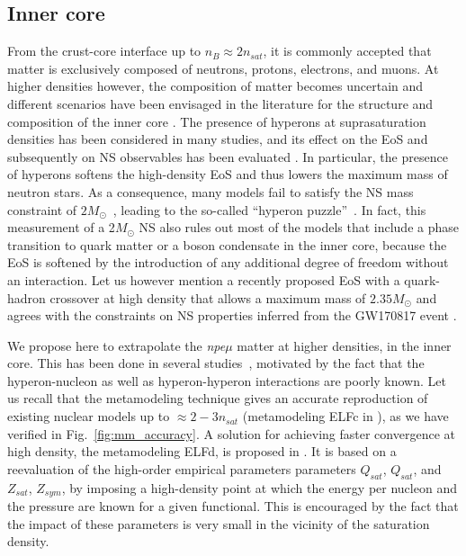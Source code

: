 \subsection{Inner core}\label{subsec:icore}

From the crust-core interface up to $n_B \approx 2n_{sat}$, it is commonly
accepted that matter is exclusively composed of neutrons, protons, electrons, 
and muons. At higher densities however, the composition of matter becomes
uncertain and different scenarios have been envisaged in the
literature for the structure and composition of the inner 
core \cite{Oertel2017}. The presence of hyperons at suprasaturation densities 
has been considered in many studies, and its effect on the EoS and 
subsequently on NS observables has been 
evaluated \cite{Bednarek2012,Fortin2015}. In particular, the 
presence of hyperons softens the high-density EoS and thus lowers the maximum 
mass of neutron stars. As a consequence, many models fail to satisfy the NS 
mass constraint of $2M_\odot$~\cite{Antoniadis2013}, leading to the so-called
``hyperon puzzle''~\cite{Zdunik2013}. In fact, this measurement of a 2$M_\odot$ 
NS also rules out most of the models that include a phase transition to quark 
matter or a boson condensate in the inner core, because the EoS is softened
by the introduction of any additional degree of freedom without an 
interaction. Let us however mention a recently proposed EoS with a 
quark-hadron crossover at high density that allows a maximum mass of 
$2.35M_\odot$ \cite{Baym2019} and agrees with the constraints on NS
properties inferred from the GW170817 event \cite{GW1,GW2}.

We propose here to extrapolate the \textit{npe$\mu$} matter at higher
densities, in the inner core. This has been done in several 
studies~\cite{Wiringa1988, Douchin2001}, motivated by the fact that the 
hyperon-nucleon as well as hyperon-hyperon interactions are poorly known. 
Let us recall that the metamodeling technique gives an accurate reproduction of
existing nuclear models up to $\approx 2-3 n_{sat}$ (metamodeling ELFc 
in \cite{Margueron2018a}), as we have verified in Fig.~\ref{fig:mm_accuracy}.
A solution for achieving faster convergence at high density, the 
metamodeling ELFd, is proposed in \cite{Margueron2018a}. It is based on a
reevaluation of the high-order empirical parameters parameters $Q_{sat}$,
$Q_{sat}$, and $Z_{sat}$, $Z_{sym}$, by imposing a high-density point at which
the energy per nucleon and the pressure are known for a given functional. This
is encouraged by the fact that the impact of these parameters is very small in
the vicinity of the saturation density.


